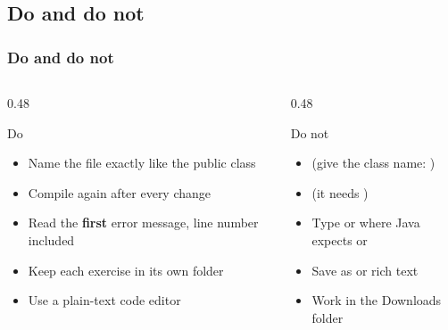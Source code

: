 \documentclass[aspectratio=169,10pt,compress]{beamer}
\begin{document}
\subsection[Rules]{Do and do not}




\begin{frame}[t,fragile] \frametitle{Do and do not}
  \begin{columns}[T]
    \begin{column}{0.48\textwidth}
      \begin{block}{Do}
        \small
        \begin{itemize}
          \item Name the file exactly like the public class
          \item Compile again after every change
          \item Read the \textbf{first} error message, line number included
          \item Keep each exercise in its own folder
          \item Use a plain-text code editor
        \end{itemize}
      \end{block}
    \end{column}
    \begin{column}{0.48\textwidth}
      \begin{alertblock}{Do not}
        \small
        \begin{itemize}
          \item {} (give the class name: )
          \item {} (it needs )
          \item Type  or  where Java expects  or 
          \item Save as  or rich text
          \item Work in the Downloads folder
        \end{itemize}
      \end{alertblock}
    \end{column}
  \end{columns}
\end{frame}

\end{document}
